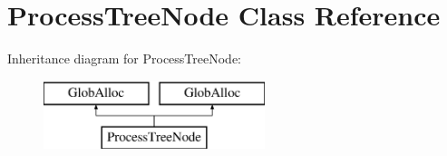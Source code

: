 \hypertarget{classProcessTreeNode}{\section{Process\-Tree\-Node Class Reference}
\label{classProcessTreeNode}
}
Inheritance diagram for Process\-Tree\-Node\-:\begin{figure}[H]
\begin{center}
\leavevmode
\includegraphics[height=2.000000cm]{classProcessTreeNode}
\end{center}
\end{figure}
